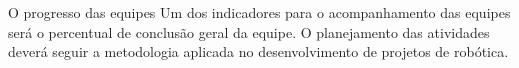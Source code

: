 \begin{frame}[t]{O progresso das equipes}
    Um dos indicadores para o acompanhamento das equipes será o percentual de conclusão geral da equipe.
    O planejamento das atividades deverá seguir a metodologia aplicada no desenvolvimento de projetos de robótica.
    \newline
\end{frame}
